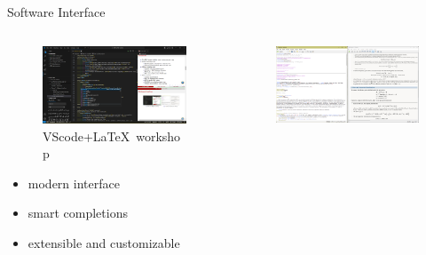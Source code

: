 \documentclass [xcolor=svgnames, t] {beamer}
\begin{document}
\begin{frame}{Software Interface}
    \begin{columns}
        \begin{column}{.45\textwidth}
            \vspace*{-1em}
            \begin{figure}
                \centering
                \includegraphics[width=\textwidth]{figures/vscode}
                \caption{VScode+\LaTeX\ workshop}
                \label{fig: vscodeLaTeXWorkshop}
            \end{figure}
            \vspace*{-1em}
            \begin{itemize}
                \item modern interface
                \item smart completions 
                \item extensible and customizable
            \end{itemize}
        \end{column}
        \begin{column}{.45\textwidth}
            \vspace*{-1em}
            \begin{figure}
                \centering
                \includegraphics[width=\textwidth]{figures/texstudio}

\end{figure}
\end{column}
\end{columns}
\end{frame}
\end{document}

